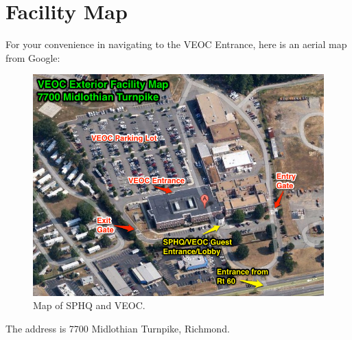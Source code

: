 \documentclass[pdflatex,letterpaper,twoside,12pt]{book}
\begin{document}




\section{Facility Map}

For your convenience in navigating to the VEOC Entrance, here is an aerial map from Google:

\begin{figure}[h!]
  \centering
  \includegraphics[width=\textwidth,keepaspectratio=true]{resources/veoc_map}
  \caption{Map of SPHQ and VEOC.\label{fig:ops-main-screen}}
\end{figure}

The address is 7700 Midlothian Turnpike, Richmond.

\end{document}
